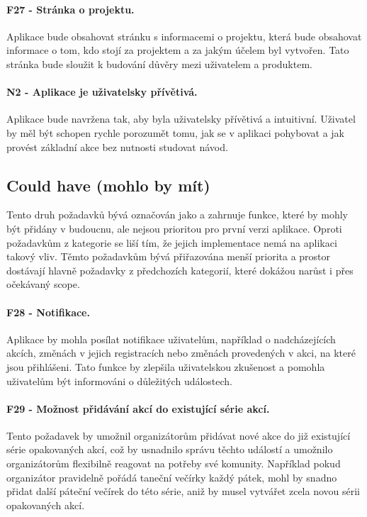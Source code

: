 \paragraph{F27 - Stránka o projektu.}\label{req:F27}
Aplikace bude obsahovat stránku s informacemi o projektu, která bude obsahovat informace o tom, kdo stojí za projektem a za jakým účelem byl vytvořen. Tato stránka bude sloužit k budování důvěry mezi uživatelem a produktem.

\paragraph{N2 - Aplikace je uživatelsky přívětivá.}\label{req:N2}
Aplikace bude navržena tak, aby byla uživatelsky přívětivá a intuitivní. Uživatel by měl být schopen rychle porozumět tomu, jak se v aplikaci pohybovat a jak provést základní akce bez nutnosti studovat návod.

\subsection{Could have (mohlo by mít)}
Tento druh požadavků bývá označován jako  a zahrnuje funkce, které by mohly být přidány v budoucnu, ale nejsou prioritou pro první verzi aplikace. Oproti požadavkům z kategorie  se liší tím, že jejich implementace nemá na aplikaci takový vliv. Těmto požadavkům bývá přiřazována menší priorita a prostor dostávají hlavně požadavky z předchozích kategorií, které dokážou narůst i přes očekávaný scope. \cite{moscow:definition}

\paragraph{F28 - Notifikace.}\label{req:F28}
Aplikace by mohla posílat notifikace uživatelům, například o nadcházejících akcích, změnách v jejich registracích nebo změnách provedených v akci, na které jsou přihlášeni. Tato funkce by zlepšila uživatelskou zkušenost a pomohla uživatelům být informováni o důležitých událostech. 

\paragraph{F29 - Možnost přidávání akcí do existující série akcí.}\label{req:F29}
Tento požadavek by umožnil organizátorům přidávat nové akce do již existující série opakovaných akcí, což by usnadnilo správu těchto událostí a umožnilo organizátorům flexibilně reagovat na potřeby své komunity. Například pokud organizátor pravidelně pořádá taneční večírky každý pátek, mohl by snadno přidat další páteční večírek do této série, aniž by musel vytvářet zcela novou sérii opakovaných akcí.

